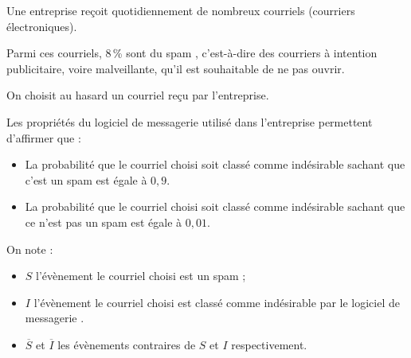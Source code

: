 Une entreprise reçoit quotidiennement de nombreux courriels (courriers électroniques).

Parmi ces courriels, 8\,\% sont du \og spam \fg, c'est-à-dire des courriers à intention publicitaire, voire malveillante, qu'il est souhaitable de ne pas ouvrir.

On choisit au hasard un courriel reçu par l'entreprise.

Les propriétés du logiciel de messagerie utilisé dans l'entreprise permettent d'affirmer que :

\begin{itemize}[leftmargin=*]
	\item La probabilité que le courriel choisi soit classé comme \og indésirable\fg{} sachant que c'est un spam est égale à $0,9$.
	\item La probabilité que le courriel choisi soit classé comme \og indésirable\fg{} sachant que ce n'est pas un spam est égale à $0,01$.
\end{itemize}

On note :

\begin{itemize}
	\item $S$ l'évènement \og le courriel choisi est un spam \fg ;
	\item $I$ l'évènement \og le courriel choisi est classé comme indésirable par le logiciel de messagerie \fg.
	\item $\overline{S}$ et $\overline{I}$ les évènements contraires de $S$ et $I$ respectivement.
\end{itemize}

